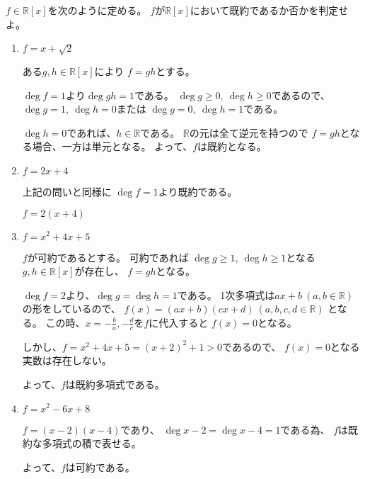 \documentclass[12pt,b5paper]{ltjsarticle}
\begin{document}
$f\in\mathbb{R}[x]$を次のように定める。
$f$が$\mathbb{R}[x]$において既約であるか否かを判定せよ。
\begin{enumerate}
 \item $f=x+\sqrt{2}$

       \dotfill

       ある$g,h\in\mathbb{R}[x]$により
       $f=gh$とする。

       $\deg{f}=1$より$\deg{gh}=1$である。
       $\deg{g}\geq 0, \ \deg{h}\geq 0$であるので、
       $\deg{g}= 1, \ \deg{h}= 0$または
       $\deg{g}= 0, \ \deg{h}= 1$である。

       $\deg{h}=0$であれば、$h\in\mathbb{R}$である。
       $\mathbb{R}$の元は全て逆元を持つので
       $f=gh$となる場合、一方は単元となる。
       よって、$f$は既約となる。

       \hrulefill

 \item $f=2x+4$

       \dotfill

       上記の問いと同様に
       $\deg{f}=1$より既約である。

       $f=2(x+4)$

       \hrulefill

 \item $f=x^2+4x+5$

       \dotfill

       $f$が可約であるとする。
       可約であれば
       $\deg{g}\geq1,\ \deg{h}\geq1$となる
       $g, h\in\mathbb{R}[x]$が存在し、
       $f=gh$となる。

       $\deg{f}=2$より、$\deg{g}=\deg{h}=1$である。
       1次多項式は$ax+b\ (a,b\in\mathbb{R})$
       の形をしているので、
       $f(x)=(ax+b)(cx+d) \ (a,b,c,d\in\mathbb{R})$
       となる。
       この時、$x=-\frac{b}{a},-\frac{d}{c}$を$f$に代入すると
       $f(x)=0$となる。

       しかし、$f=x^2+4x+5=(x+2)^2+1>0$であるので、
       $f(x)=0$となる実数は存在しない。

       よって、$f$は既約多項式である。

       \hrulefill

 \item $f=x^2-6x+8$

       \dotfill

       $f=(x - 2)(x - 4)$であり、
       $\deg{x - 2}=\deg{x - 4}=1$である為、
       $f$は既約な多項式の積で表せる。

       よって、$f$は可約である。


\end{enumerate}
\end{document}
